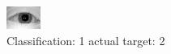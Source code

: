 \begin{figure}[h!]
\begin{center}
\includegraphics[width=0.60\columnwidth]{figures/ID902_class_1_target_2.png}
\end{center}
\caption{ Classification: 1 actual target: 2}
\label{fig:ID902_class_1_target_2}
\end{figure}
